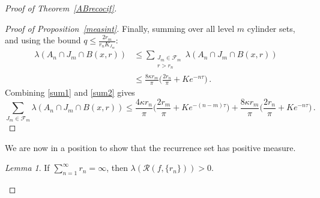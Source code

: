 \documentclass[11pt,reqno]{amsart}
\newcommand{\0}{\mathbf{0}}
\newtheorem{lemma}{Lemma}
\theoremstyle{remark}
\numberwithin{equation}{section}
\newtheorem{lemma}[theorem]{Lemma}
\theoremstyle{remark}
\numberwithin{equation}{section}
\begin{document}
\begin{proof}[Proof of Theorem~\ref{ABrecocif}]
\begin{proof}[Proof of Proposition~\ref{measint}]
Finally, summing over all level $m$ cylinder sets, and using the bound $q \leq \frac{2r_m}{r_n K_{J_m}}$:
\begin{align}\label{sum2}
    \lambda(A_n \cap J_m \cap B(x,r)) &\leq \sum\limits_{\substack{J_m \in \mathcal{F}_m  \\ r > r_n}} \lambda(A_n \cap J_m \cap B(x,r)) \nonumber %
    \\[2ex] & \leq \frac{8\kappa r_m}{\pi}\big(\frac{2r_n}{\pi}+Ke^{-n\tau} \big) \, .
\end{align}
Combining \eqref{sum1} and \eqref{sum2} gives 
$$
\sum\limits_{J_m \in \mathcal{F}_m } \lambda(A_n \cap J_m \cap B(x,r)) \leq \frac{4\kappa r_n}{\pi}\big(\frac{2r_m}{\pi}+Ke^{-(n-m)\tau}\big) + \frac{8\kappa r_m}{\pi}\big(\frac{2r_n}{\pi}+Ke^{-n\tau} \big)\, .
$$
    \end{proof}
We are now in a position to show that the recurrence set has positive measure.

\begin{lemma}\label{posmeas} If 
$
\sum\limits_{n=1}^\infty r_n = \infty
$, then
    $\lambda(\mathcal{R}(f,\{r_n\}))>0$.
\end{lemma}


\end{proof}
\end{document}
